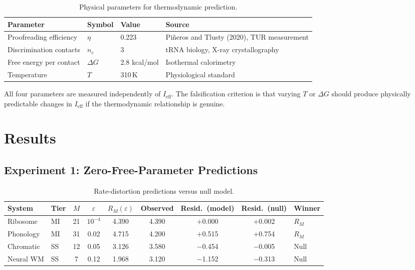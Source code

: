 \documentclass[12pt,a4paper]{article}
\begin{document}
\begin{table}[ht]
\centering
\caption{Physical parameters for thermodynamic prediction.}
\begin{tabular}{llll}
\toprule
Parameter & Symbol & Value & Source \\
\midrule
Proofreading efficiency & $\eta$ & 0.223 & Pi\~neros and Tlusty (2020), TUR measurement \\
Discrimination contacts & $n_c$ & 3 & tRNA biology, X-ray crystallography \\
Free energy per contact & $\Delta G$ & 2.8 kcal/mol & Isothermal calorimetry \\
Temperature & $T$ & 310\,K & Physiological standard \\
\bottomrule
\end{tabular}
\label{tab:params}
\end{table}

All four parameters are measured independently of $I_{\mathrm{eff}}$. The falsification criterion is that varying $T$ or $\Delta G$ should produce physically predictable changes in $I_{\mathrm{eff}}$ if the thermodynamic relationship is genuine.

\section{Results}

\subsection{Experiment 1: Zero-Free-Parameter Predictions}

\begin{table}[ht]
\centering
\caption{Rate-distortion predictions versus null model.}
\small
\begin{tabular}{llccccccl}
\toprule
System & Tier & $M$ & $\varepsilon$ & $R_M(\varepsilon)$ & Observed & Resid.\ (model) & Resid.\ (null) & Winner \\
\midrule
Ribosome & MI & 21 & $10^{-4}$ & 4.390 & 4.390 & $+$0.000 & $+$0.002 & $R_M$ \\
Phonology & MI & 31 & 0.02 & 4.715 & 4.200 & $+$0.515 & $+$0.754 & $R_M$ \\
Chromatic & SS & 12 & 0.05 & 3.126 & 3.580 & $-$0.454 & $-$0.005 & Null \\
Neural WM & SS & 7 & 0.12 & 1.968 & 3.120 & $-$1.152 & $-$0.313 & Null \\
\bottomrule
\end{tabular}
\label{tab:zeroparam}
\end{table}
\end{document}
